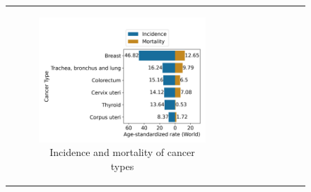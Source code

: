 \begin{figure}[ht] \begin{tabular}{cc} \begin{subfigure}{0.5\textwidth}
            \centering

            \includegraphics[width=\linewidth]{chapters/2_background/figures/bar.png}
            \caption{Incidence and mortality of cancer types}
            \label{fig:brca_bar}
        \end{subfigure} & \begin{subfigure}{0.5\textwidth} \centering


\end{subfigure}
\end{tabular}
\end{figure}
